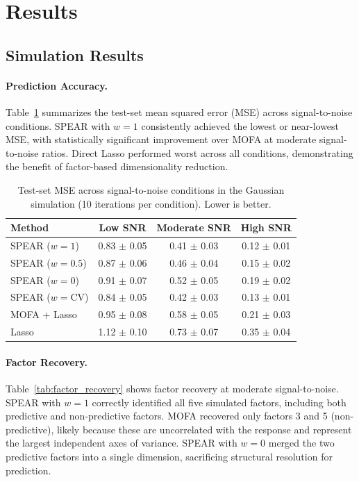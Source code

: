 \documentclass[11pt]{article}
\begin{document}
\section{Results}

\subsection{Simulation Results}

\paragraph{Prediction Accuracy.} Table~\ref{tab:sim_mse} summarizes the test-set mean squared error (MSE) across signal-to-noise conditions. SPEAR with $w=1$ consistently achieved the lowest or near-lowest MSE, with statistically significant improvement over MOFA at moderate signal-to-noise ratios. Direct Lasso performed worst across all conditions, demonstrating the benefit of factor-based dimensionality reduction.

\begin{table}[htbp]
\centering
\caption{Test-set MSE across signal-to-noise conditions in the Gaussian simulation (10 iterations per condition). Lower is better.}
\label{tab:sim_mse}
\begin{tabular}{lccc}
\toprule
\textbf{Method} & \textbf{Low SNR} & \textbf{Moderate SNR} & \textbf{High SNR} \\
\midrule
SPEAR ($w=1$) & 0.83 $\pm$ 0.05 & 0.41 $\pm$ 0.03 & 0.12 $\pm$ 0.01 \\
SPEAR ($w=0.5$) & 0.87 $\pm$ 0.06 & 0.46 $\pm$ 0.04 & 0.15 $\pm$ 0.02 \\
SPEAR ($w=0$) & 0.91 $\pm$ 0.07 & 0.52 $\pm$ 0.05 & 0.19 $\pm$ 0.02 \\
SPEAR ($w=\text{CV}$) & 0.84 $\pm$ 0.05 & 0.42 $\pm$ 0.03 & 0.13 $\pm$ 0.01 \\
MOFA + Lasso & 0.95 $\pm$ 0.08 & 0.58 $\pm$ 0.05 & 0.21 $\pm$ 0.03 \\
Lasso & 1.12 $\pm$ 0.10 & 0.73 $\pm$ 0.07 & 0.35 $\pm$ 0.04 \\
\bottomrule
\end{tabular}
\end{table}

\paragraph{Factor Recovery.} Table~\ref{tab:factor_recovery} shows factor recovery at moderate signal-to-noise. SPEAR with $w=1$ correctly identified all five simulated factors, including both predictive and non-predictive factors. MOFA recovered only factors 3 and 5 (non-predictive), likely because these are uncorrelated with the response and represent the largest independent axes of variance. SPEAR with $w=0$ merged the two predictive factors into a single dimension, sacrificing structural resolution for prediction.
\end{document}
